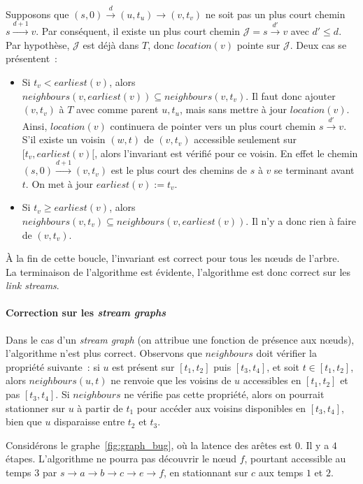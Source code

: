 \documentclass[12pt,a4paper]{article}
\begin{document}
Supposons que \((s, 0) \xrightarrow{d} (u, t_u) \rightarrow (v, t_v)\)
ne soit pas un plus court chemin \(s \xrightarrow{d+1} v\). Par
conséquent, il existe un plus court chemin
\(\mathcal{J} = s \xrightarrow{d'} v\) avec \(d' \leq d\). Par
hypothèse, \(\mathcal{J}\) est déjà dans \(T\), donc \(location(v)\)
pointe sur \(\mathcal{J}\). Deux cas se présentent~:
\begin{itemize}
\item Si \(t_v < earliest(v)\), alors
  \(neighbours(v, earliest(v)) \subseteq neighbours(v, t_v)\). Il faut
  donc ajouter \((v, t_v)\) à \(T\) avec comme parent \(u, t_u\), mais
  sans mettre à jour \(location(v)\). Ainsi, \(location(v)\)
  continuera de pointer vers un plus court chemin
  \(s \xrightarrow{d'} v\). S'il existe un voisin \((w, t)\) de
  \((v, t_v)\) accessible seulement sur \([t_v, earliest(v)[\), alors
  l'invariant est vérifié pour ce voisin. En effet le chemin
  \((s, 0) \xrightarrow{d+1} (v, t_v)\) est le plus court des chemins
  de \(s\) à \(v\) se terminant avant \(t\). On met à jour
  \(earliest(v) := t_v\).
\item Si \(t_v \geq earliest(v)\), alors \(neighbours(v, t_v)
  \subseteq neighbours(v, earliest(v))\). Il n'y a donc rien à faire
  de \((v, t_v)\).
\end{itemize}
À la fin de cette boucle, l'invariant est correct pour tous les nœuds
de l'arbre.\\

La terminaison de l'algorithme est évidente, l'algorithme est donc
correct sur les \textit{link streams}.

\paragraph{Correction sur les \textit{stream graphs}} Dans le cas d'un
\textit{stream graph} (on attribue une fonction de présence aux
nœuds), l'algorithme n'est plus correct. Observons que \(neighbours\)
doit vérifier la propriété suivante~: si \(u\) est présent sur
\([t_1, t_2]\) puis \([t_3, t_4]\), et soit \(t \in [t_1, t_2]\),
alors \(neighbours(u, t)\) ne renvoie que les voisins de \(u\)
accessibles en \([t_1, t_2]\) et pas \([t_3, t_4]\). Si \(neighbours\)
ne vérifie pas cette propriété, alors on pourrait stationner sur \(u\)
à partir de \(t_1\) pour accéder aux voisins disponibles en
\([t_3, t_4]\), bien que \(u\) disparaisse entre \(t_2\) et \(t_3\).

Considérons le graphe~\ref{fig:graph_bug}, où la latence des arêtes
est \(0\). Il y a \(4\) étapes. L'algorithme ne pourra pas découvrir
le nœud \(f\), pourtant accessible au temps 3 par
\(s \rightarrow a \rightarrow b \rightarrow c \rightarrow e
\rightarrow f\), en stationnant sur \(c\) aux temps \(1\) et \(2\).
\end{document}
